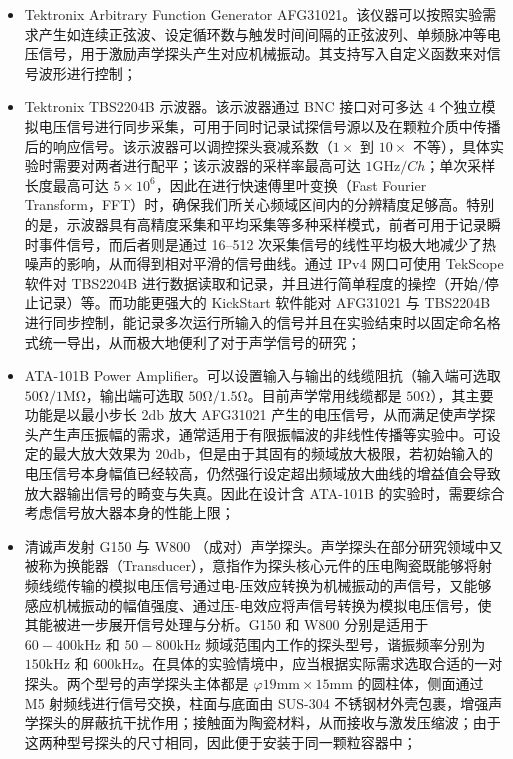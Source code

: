 \begin{itemize}
  \item Tektronix Arbitrary Function Generator AFG31021。该仪器可以按照实验需求产生如连续正弦波、设定循环数与触发时间间隔的正弦波列、单频脉冲等电压信号，用于激励声学探头产生对应机械振动。其支持写入自定义函数来对信号波形进行控制；
  \item Tektronix TBS2204B 示波器。该示波器通过 BNC 接口对可多达 $4$ 个独立模拟电压信号进行同步采集，可用于同时记录试探信号源以及在颗粒介质中传播后的响应信号。该示波器可以调控探头衰减系数（$1\times$ 到 $10\times$ 不等），具体实验时需要对两者进行配平；该示波器的采样率最高可达 $1\unit{\giga\hertz}/\unit{Ch}$；单次采样长度最高可达 $5\times 10^{6}$，因此在进行快速傅里叶变换（Fast Fourier Transform，FFT）时，确保我们所关心频域区间内的分辨精度足够高。特别的是，示波器具有高精度采集和平均采集等多种采样模式，前者可用于记录瞬时事件信号，而后者则是通过 \numrange{16}{512} 次采集信号的线性平均极大地减少了热噪声的影响，从而得到相对平滑的信号曲线。通过 IPv4 网口可使用 TekScope 软件对 TBS2204B 进行数据读取和记录，并且进行简单程度的操控（开始/停止记录）等。而功能更强大的 KickStart 软件能对 AFG31021 与 TBS2204B 进行同步控制，能记录多次运行所输入的信号并且在实验结束时以固定命名格式统一导出，从而极大地便利了对于声学信号的研究；
  \item ATA-101B Power Amplifier。可以设置输入与输出的线缆阻抗（输入端可选取 $50\unit{\ohm}/1\unit{\mega\ohm}$，输出端可选取 $50\unit{\ohm}/1.5\unit{\ohm}$。目前声学常用线缆都是 $50\unit{\ohm}$），其主要功能是以最小步长 $2\unit{\decibel}$ 放大 AFG31021 产生的电压信号，从而满足使声学探头产生声压振幅的需求，通常适用于有限振幅波的非线性传播等实验中。可设定的最大放大效果为 $20\unit{\decibel}$，但是由于其固有的频域放大极限，若初始输入的电压信号本身幅值已经较高，仍然强行设定超出频域放大曲线的增益值会导致放大器输出信号的畸变与失真。因此在设计含 ATA-101B 的实验时，需要综合考虑信号放大器本身的性能上限；
  \item 清诚声发射 G150 与 W800 （成对）声学探头。声学探头在部分研究领域中又被称为换能器（Transducer），意指作为探头核心元件的压电陶瓷既能够将射频线缆传输的模拟电压信号通过电-压效应转换为机械振动的声信号，又能够感应机械振动的幅值强度、通过压-电效应将声信号转换为模拟电压信号，使其能被进一步展开信号处理与分析。G150 和 W800 分别是适用于 $60-400\unit{\kilo\Hz}$ 和 $50-800\unit{\kilo\hertz}$ 频域范围内工作的探头型号，谐振频率分别为 $150\unit{\kilo\hertz}$ 和 $600\unit{\kilo\hertz}$。在具体的实验情境中，应当根据实际需求选取合适的一对探头。两个型号的声学探头主体都是 $\varphi 19\unit{\milli\meter}\times 15\unit{\milli\meter}$ 的圆柱体，侧面通过 M5 射频线进行信号交换，柱面与底面由 SUS-304 不锈钢材外壳包裹，增强声学探头的屏蔽抗干扰作用；接触面为陶瓷材料，从而接收与激发压缩波；由于这两种型号探头的尺寸相同，因此便于安装于同一颗粒容器中；

\end{itemize}
